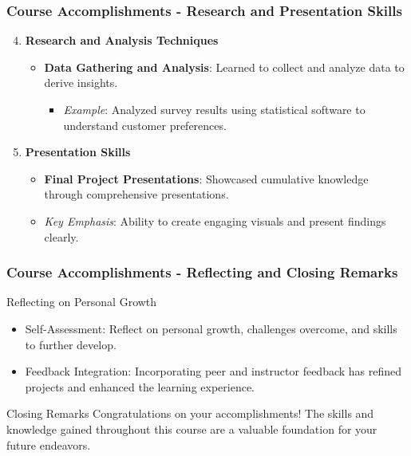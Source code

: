 \documentclass[aspectratio=169]{beamer}
\begin{document}
\begin{frame}[fragile]
    \frametitle{Course Accomplishments - Research and Presentation Skills}
    \begin{enumerate}
        \setcounter{enumi}{3}
        \item \textbf{Research and Analysis Techniques}
            \begin{itemize}
                \item \textbf{Data Gathering and Analysis}: Learned to collect and analyze data to derive insights.
                    \begin{itemize}
                        \item \textit{Example}: Analyzed survey results using statistical software to understand customer preferences.
                    \end{itemize}
            \end{itemize}

        \item \textbf{Presentation Skills}
            \begin{itemize}
                \item \textbf{Final Project Presentations}: Showcased cumulative knowledge through comprehensive presentations.
                    \item \textit{Key Emphasis}: Ability to create engaging visuals and present findings clearly.
            \end{itemize}
    \end{enumerate}
\end{frame}

\begin{frame}[fragile]
    \frametitle{Course Accomplishments - Reflecting and Closing Remarks}
    \begin{block}{Reflecting on Personal Growth}
        \begin{itemize}
            \item Self-Assessment: Reflect on personal growth, challenges overcome, and skills to further develop.
            \item Feedback Integration: Incorporating peer and instructor feedback has refined projects and enhanced the learning experience.
        \end{itemize}
    \end{block}
    
    \begin{block}{Closing Remarks}
        Congratulations on your accomplishments! The skills and knowledge gained throughout this course are a valuable foundation for your future endeavors.
    \end{block}
\end{frame}
\end{document}
